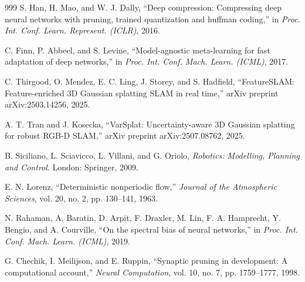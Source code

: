 \documentclass[12pt,a4paper,oneside]{report}
\begin{document}
\begin{thebibliography}{999}
S. Han, H. Mao, and W. J. Dally, ``Deep compression: Compressing deep neural networks with pruning, trained quantization and huffman coding,'' in \textit{Proc. Int. Conf. Learn. Represent. (ICLR)}, 2016.

C. Finn, P. Abbeel, and S. Levine, ``Model-agnostic meta-learning for fast adaptation of deep networks,'' in \textit{Proc. Int. Conf. Mach. Learn. (ICML)}, 2017.

C. Thirgood, O. Mendez, E. C. Ling, J. Storey, and S. Hadfield, ``{FeatureSLAM}: Feature-enriched {3D} Gaussian splatting {SLAM} in real time,'' arXiv preprint arXiv:2503.14256, 2025.

A. T. Tran and J. Kosecka, ``{VarSplat}: Uncertainty-aware {3D} Gaussian splatting for robust {RGB-D} {SLAM},'' arXiv preprint arXiv:2507.08762, 2025.

B. Siciliano, L. Sciavicco, L. Villani, and G. Oriolo, \textit{Robotics: Modelling, Planning and Control}. London: Springer, 2009.

E. N. Lorenz, ``Deterministic nonperiodic flow,'' \textit{Journal of the Atmospheric Sciences}, vol. 20, no. 2, pp. 130--141, 1963.

N. Rahaman, A. Baratin, D. Arpit, F. Draxler, M. Lin, F. A. Hamprecht, Y. Bengio, and A. Courville, ``On the spectral bias of neural networks,'' in \textit{Proc. Int. Conf. Mach. Learn. (ICML)}, 2019.

G. Chechik, I. Meilijson, and E. Ruppin, ``Synaptic pruning in development: A computational account,'' \textit{Neural Computation}, vol. 10, no. 7, pp. 1759--1777, 1998.
\end{thebibliography}
\end{document}
